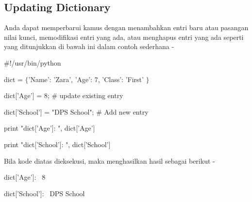 \subsection*{Updating Dictionary}
 \par
\begin{adjustwidth}{0.03in}{0.03in}
Anda dapat memperbarui kamus dengan menambahkan entri baru atau pasangan nilai kunci, memodifikasi entri yang ada, atau menghapus entri yang ada seperti yang ditunjukkan di bawah ini dalam contoh sederhana -\end{adjustwidth}
 \par
\noindent 
 \hspace*{0.5in}  $  \#  $!/usr/bin/python \par
\vspace{12pt}
\noindent 
 \hspace*{0.5in} dict =  $  \{  $'Name': 'Zara', 'Age': 7, 'Class': 'First' $  \}  $ \par
\vspace{12pt}
\noindent 
 \hspace*{0.5in} dict['Age'] = 8;  $  \#  $ update existing entry \par
\noindent 
 \hspace*{0.5in} dict['School'] = "DPS School";  $  \#  $ Add new entry \par
\vspace{12pt}
\vspace{12pt}
\noindent 
 \hspace*{0.5in} print "dict['Age']: ", dict['Age'] \par
\noindent 
 \hspace*{0.5in} print "dict['School']: ", dict['School'] \par
\begin{adjustwidth}{0.03in}{0.03in}
Bila kode diatas dieksekusi, maka menghasilkan hasil sebagai berikut -\end{adjustwidth}
 \par
\noindent 
{\fontsize{9pt}{9pt}\selectfont  \hspace*{0.5in} dict['Age']:~ 8} \par
\noindent 
{\fontsize{9pt}{9pt}\selectfont  \hspace*{0.5in} dict['School']:~ DPS School} \par
\vspace{12pt}
\vspace{12pt}
